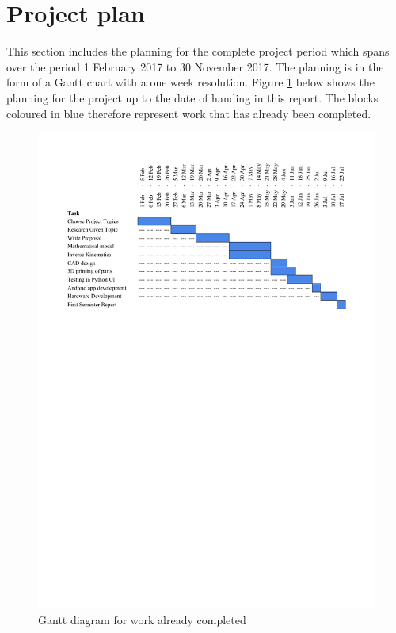 
\section{Project plan}

This section includes the planning for the complete project period which spans over the period 1 February 2017 to 30 November 2017. The planning is in the form of a Gantt chart with a one week resolution. Figure \ref{fig:Gantt1} below shows the planning for the project up to the date of handing in this report. The blocks coloured in blue therefore represent work that has already been completed.\\

\begin{figure}[htbp]
    \centering
        \includegraphics[clip, trim=1.5cm 18cm 1.5cm 1.5cm, width=1.00\textwidth]{pics/Gantt1.pdf}
    \caption{Gantt diagram for work already completed}
    \label{fig:Gantt1}
\end{figure}

